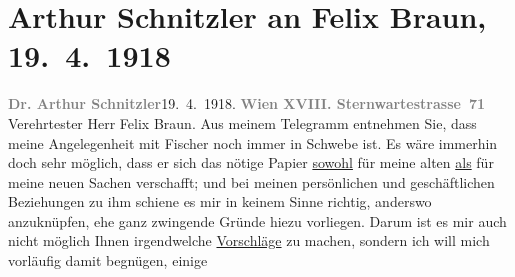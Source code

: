 

         
         \renewcommand{\erwaehntePersonen}{Personen: Felix Braun}
         \renewcommand{\erwaehnteInstitutionen}{Institutionen: Georg Müller Verlag, S. Fischer Verlag}
         \renewcommand{\erwaehnteOrte}{Orte: München, Sternwartestraße, Wien}
         \renewcommand{\erwaehnteWerke}{Werke: Casanovas Heimfahrt, Die Schwestern oder Casanova in Spa. Lustspiel in Versen, Doktor Gräsler, Badearzt, Gesammelte Werke}
               \section[Arthur Schnitzler an Felix Braun, 19. 4. 1918]{ Arthur Schnitzler an Felix Braun, 19. 4. 1918}\nopagebreak{}\rehead{ }\begin{ledgroupsized}[t]{13cm}\normalsize\beginnumbering \toendnotes[C]{\smallbreak\pagebreak[2]} 
\toendnotes[C]{\smallbreak}\pstart
           {\pb}\textcolor{gray}{\textbf{Dr. Arthur Schnitzler}}\hfill 19. 4. 1918.\pend
           \pstart
           \textcolor{gray}{\textbf{Wien XVIII. Sternwartestrasse 71}}\pend
           \pstart\center{}Verehrtester Herr Felix Braun.\pend\pstart
           Aus meinem Telegramm entnehmen Sie, dass meine Angelegenheit mit Fischer noch immer in Schwebe ist. Es wäre immerhin doch sehr
               möglich, dass er sich das nötige Papier \uline{sowohl} für
               meine alten \uline{als} für meine neuen Sachen verschafft;
               und bei meinen persönlichen und geschäftlichen Beziehungen zu ihm schiene es mir in
               keinem Sinne richtig, anderswo anzuknüpfen, ehe ganz zwingende Gründe hiezu
               vorliegen. Darum ist es mir auch nicht möglich Ihnen \introOben{}irgend\introOben{}welche \uline{Vorschläge} zu machen, sondern ich
               will mich vorläufig damit begnügen,  einige

\end{ledgroupsized}

